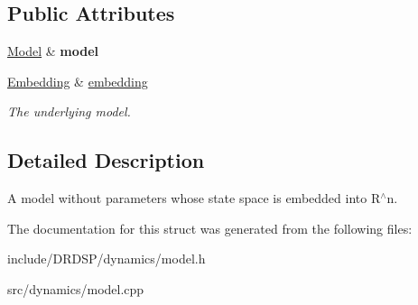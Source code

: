 \subsection*{Public Attributes}
\begin{DoxyCompactItemize}
\item 
\hypertarget{struct_d_r_d_s_p_1_1_model_embedded_a2d021cf215cdd084fde36bbd46101cc5}{\hyperlink{struct_d_r_d_s_p_1_1_model}{Model} \& {\bfseries model}}\label{struct_d_r_d_s_p_1_1_model_embedded_a2d021cf215cdd084fde36bbd46101cc5}

\item 
\hypertarget{struct_d_r_d_s_p_1_1_model_embedded_a22aeda6bb7f303b3e79a6f133887439b}{\hyperlink{struct_d_r_d_s_p_1_1_embedding}{Embedding} \& \hyperlink{struct_d_r_d_s_p_1_1_model_embedded_a22aeda6bb7f303b3e79a6f133887439b}{embedding}}\label{struct_d_r_d_s_p_1_1_model_embedded_a22aeda6bb7f303b3e79a6f133887439b}

\begin{DoxyCompactList}\small\item\em The underlying model. \end{DoxyCompactList}\end{DoxyCompactItemize}


\subsection{Detailed Description}
A model without parameters whose state space is embedded into R$^\wedge$n. 

The documentation for this struct was generated from the following files\-:\begin{DoxyCompactItemize}
\item 
include/\-D\-R\-D\-S\-P/dynamics/model.\-h\item 
src/dynamics/model.\-cpp\end{DoxyCompactItemize}
